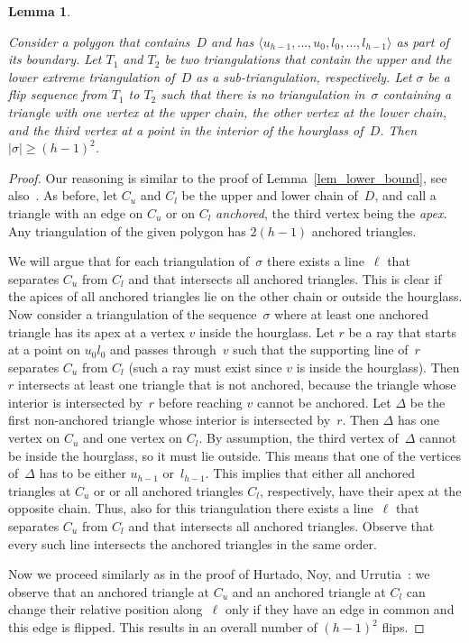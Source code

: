 \documentclass[a4paper,11pt]{article}
\newtheorem{lemma}[theorem]{Lemma}
\newcommand{\qedopt}{}
\begin{document}
\begin{lemma}\label{lem_empty_wedge}
\begin{sloppypar}
Consider a polygon that contains~$D$ and has $\langle u_{h-1}, \dots, u_0, l_0, \dots, l_{h-1} \rangle$ as part of 
its boundary. Let $T_1$ and $T_2$ be two triangulations that contain the upper and 
the lower extreme triangulation of~$D$ as a sub-triangulation, respectively.
Let $\sigma$ be a flip sequence from $T_1$ to $T_2$ such that there is no triangulation in~$\sigma$ containing a triangle with one vertex at the upper chain, the other vertex at the lower chain, and the third vertex at a point in the interior of the hourglass of~$D$.
Then $|\sigma| \geq (h-1)^2$.
\end{sloppypar}
\end{lemma}
\begin{proof}
Our reasoning is similar to the proof of Lemma~\ref{lem_lower_bound}, 
see also~\cite{lubiw}. As before, let $C_u$ and $C_l$
be the upper and lower chain of~$D$, and call a
triangle with an edge on $C_u$ or on $C_l$ \emph{anchored},
the third vertex being the \emph{apex}.
Any triangulation of the given polygon has $2(h-1)$ anchored triangles.

We will argue that for each triangulation of~$\sigma$ there 
exists a line~$\ell$ that separates $C_u$ from $C_l$
and that intersects all anchored triangles.
This is clear if the apices of all anchored triangles
lie on the other chain or outside the hourglass.
Now consider a triangulation of the sequence~$\sigma$ where 
at least one anchored triangle has its apex at a 
vertex $v$ inside the hourglass.
Let $r$ be a ray that starts at a point on $u_0 l_0$ and 
passes through~$v$ such that the supporting line of~$r$ separates 
$C_u$ from $C_l$ (such a ray must exist 
since $v$ is inside the hourglass).
Then $r$ intersects at least one triangle that 
is not anchored, because the triangle whose interior is intersected 
by~$r$ before reaching $v$ cannot be anchored.
Let $\Delta$ be the first non-anchored triangle whose 
interior is intersected by~$r$.
Then $\Delta$ has one vertex on $C_u$
and one vertex on $C_l$. By assumption, the 
third vertex of~$\Delta$  cannot be inside the hourglass,
so it must lie outside.
This means that one of the vertices 
of~$\Delta$ has to be either $u_{h-1}$ or~$l_{h-1}$.
This  implies that either all anchored triangles at $C_u$ or
or all anchored triangles $C_l$, 
respectively, have their apex at the opposite chain.
Thus, also for this triangulation there exists a line~$\ell$ 
that separates $C_u$ from $C_l$ and that 
intersects all anchored triangles. Observe that every such line
intersects the anchored triangles in the same order.

Now we proceed similarly as in the proof 
of Hurtado, Noy, and Urrutia~\cite{hurtado_noy_urrutia}: 
we observe that an anchored triangle at $C_u$  and an anchored triangle 
at $C_l$ can change their relative position 
along~$\ell$ only if they have an edge in common and this edge is flipped.
This results in an overall number of $(h-1)^2$ flips.
\qedopt
\end{proof}
\end{document}
